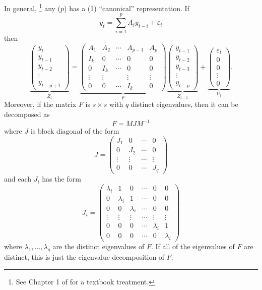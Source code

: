 \documentclass[12pt,fleqn]{article}
\newcommand{\vep}{\varepsilon}
\begin{document}
In general,%
\footnote{See Chapter 1 of \citet{Ham:94} for a textbook treatment.} %
any \VAR($p$) has a \VAR(1) ``canonical'' representation. If
\[
y_t = \sum_{i=1}^p A_i y_{t-i} + \vep_t
\]
then
\[
\underbrace{\begin{pmatrix}
  y_t \\ y_{t-1} \\ y_{t-2} \\ \vdots \\ y_{t-p+1}
\end{pmatrix}}_{Z_t}
=
\underbrace{\begin{pmatrix}
  A_1 & A_2 & \cdots & A_{p-1} & A_p \\
  I_k & 0   & \cdots & 0 & 0 \\
  0  & I_k  & \cdots & 0 & 0 \\
  \vdots & \vdots & & \vdots & \vdots \\
  0 & 0 & \cdots & I_k & 0 
\end{pmatrix}}_{F}
\underbrace{\begin{pmatrix}
  y_{t-1} \\ y_{t-2} \\ y_{t-3} \\ \vdots \\ y_{t-p}
\end{pmatrix}}_{Z_{t-1}}
+
\underbrace{\begin{pmatrix}
  \vep_{t} \\ 0 \\ 0 \\ \vdots \\ 0
\end{pmatrix}}_{U_t}.
\]
Moreover, if the matrix $F$ is $s \times s$ with $q$ distinct
eigenvalues, then it can be decomposed as
\[
F = M J M^{-1}
\]
where $J$ is block diagonal of the form
\[
J = \begin{pmatrix}
  J_1 & 0 & \cdots & 0 \\
  0 & J_2 & \cdots & 0 \\
  \vdots & \vdots & \cdots & \vdots \\
  0 & 0 & \cdots & J_q
\end{pmatrix}
\]
and each $J_i$ has the form
\[
J_i =
\begin{pmatrix}
  \lambda_i & 1 & 0 & \cdots & 0 & 0 \\
  0 & \lambda_i & 1 & \cdots & 0 & 0 \\
  0 & 0 & \lambda_i & \cdots & 0 & 0 \\
  \vdots & \vdots & \vdots & \cdots & \vdots & \vdots \\
  0 & 0 & 0 & \cdots & \lambda_i & 1 \\
  0 & 0 & 0 & \cdots & 0 & \lambda_i
\end{pmatrix}
\]
where $\lambda_1,\dots,\lambda_q$ are the distinct eigenvalues of $F$.
If all of the eigenvalues of $F$ are distinct, this is just the
eigenvalue decomposition of $F$.
\end{document}
